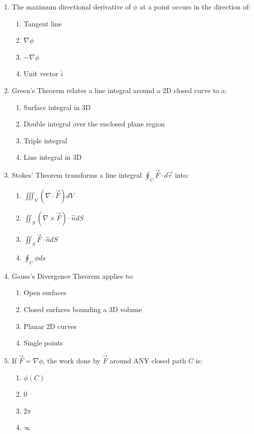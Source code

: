\begin{enumerate}[leftmargin=1.5em]
    \item The maximum directional derivative of $\phi$ at a point occurs in the direction of:
    \begin{enumerate}[label=(\alph*)]
        \item Tangent line
        \item $\nabla\phi$
        \item $-\nabla\phi$
        \item Unit vector $\hat{i}$
    \end{enumerate}

    \item Green's Theorem relates a line integral around a 2D closed curve to a:
    \begin{enumerate}[label=(\alph*)]
        \item Surface integral in 3D
        \item Double integral over the enclosed plane region
        \item Triple integral
        \item Line integral in 3D
    \end{enumerate}

    \item Stokes' Theorem transforms a line integral $\oint_C \vec{F}\cdot d\vec{r}$ into:
    \begin{enumerate}[label=(\alph*)]
        \item $\iiint_V (\nabla\cdot\vec{F}) dV$
        \item $\iint_S (\nabla\times\vec{F})\cdot\hat{n} dS$
        \item $\iint_S \vec{F}\cdot\hat{n} dS$
        \item $\oint_C \phi ds$
    \end{enumerate}

    \item Gauss's Divergence Theorem applies to:
    \begin{enumerate}[label=(\alph*)]
        \item Open surfaces
        \item Closed surfaces bounding a 3D volume
        \item Planar 2D curves
        \item Single points
    \end{enumerate}

    \item If $\vec{F} = \nabla\phi$, the work done by $\vec{F}$ around ANY closed path $C$ is:
    \begin{enumerate}[label=(\alph*)]
        \item $\phi(C)$
        \item 0
        \item $2\pi$
        \item $\infty$
    \end{enumerate}


\end{enumerate}
